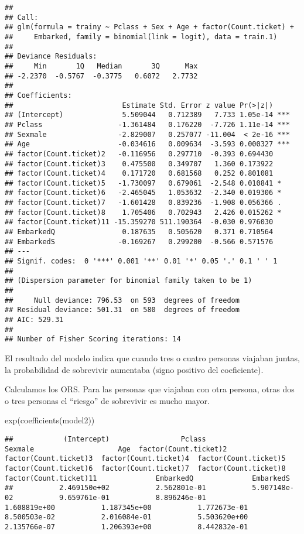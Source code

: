\documentclass[
]{article}
\newenvironment{Shaded}{\begin{snugshade}}{\end{snugshade}}
\newcommand{\KeywordTok}[1]{\textcolor[rgb]{0.94,0.87,0.69}{#1}}
\newcommand{\NormalTok}[1]{\textcolor[rgb]{0.80,0.80,0.80}{#1}}
\begin{document}
\begin{verbatim}
## 
## Call:
## glm(formula = trainy ~ Pclass + Sex + Age + factor(Count.ticket) + 
##     Embarked, family = binomial(link = logit), data = train.1)
## 
## Deviance Residuals: 
##     Min       1Q   Median       3Q      Max  
## -2.2370  -0.5767  -0.3775   0.6072   2.7732  
## 
## Coefficients:
##                          Estimate Std. Error z value Pr(>|z|)    
## (Intercept)              5.509044   0.712389   7.733 1.05e-14 ***
## Pclass                  -1.361484   0.176220  -7.726 1.11e-14 ***
## Sexmale                 -2.829007   0.257077 -11.004  < 2e-16 ***
## Age                     -0.034616   0.009634  -3.593 0.000327 ***
## factor(Count.ticket)2   -0.116956   0.297710  -0.393 0.694430    
## factor(Count.ticket)3    0.475500   0.349707   1.360 0.173922    
## factor(Count.ticket)4    0.171720   0.681568   0.252 0.801081    
## factor(Count.ticket)5   -1.730097   0.679061  -2.548 0.010841 *  
## factor(Count.ticket)6   -2.465045   1.053632  -2.340 0.019306 *  
## factor(Count.ticket)7   -1.601428   0.839236  -1.908 0.056366 .  
## factor(Count.ticket)8    1.705406   0.702943   2.426 0.015262 *  
## factor(Count.ticket)11 -15.359270 511.190364  -0.030 0.976030    
## EmbarkedQ                0.187635   0.505620   0.371 0.710564    
## EmbarkedS               -0.169267   0.299200  -0.566 0.571576    
## ---
## Signif. codes:  0 '***' 0.001 '**' 0.01 '*' 0.05 '.' 0.1 ' ' 1
## 
## (Dispersion parameter for binomial family taken to be 1)
## 
##     Null deviance: 796.53  on 593  degrees of freedom
## Residual deviance: 501.31  on 580  degrees of freedom
## AIC: 529.31
## 
## Number of Fisher Scoring iterations: 14
\end{verbatim}

El resultado del modelo indica que cuando tres o cuatro personas
viajaban juntas, la probabilidad de sobrevivir aumentaba (signo positivo
del coeficiente).

Calculamos los ORS. Para las personas que viajaban con otra persona,
otras dos o tres personas el ``riesgo'' de sobrevivir es mucho mayor.

\begin{Shaded}
\begin{Highlighting}[]
\KeywordTok{exp}\NormalTok{(}\KeywordTok{coefficients}\NormalTok{(model2))}
\end{Highlighting}
\end{Shaded}

\begin{verbatim}
##            (Intercept)                 Pclass                Sexmale                    Age  factor(Count.ticket)2  factor(Count.ticket)3  factor(Count.ticket)4  factor(Count.ticket)5  factor(Count.ticket)6  factor(Count.ticket)7  factor(Count.ticket)8 factor(Count.ticket)11              EmbarkedQ              EmbarkedS 
##           2.469150e+02           2.562801e-01           5.907148e-02           9.659761e-01           8.896246e-01           1.608819e+00           1.187345e+00           1.772673e-01           8.500503e-02           2.016084e-01           5.503620e+00           2.135766e-07           1.206393e+00           8.442832e-01
\end{verbatim}
\end{document}
